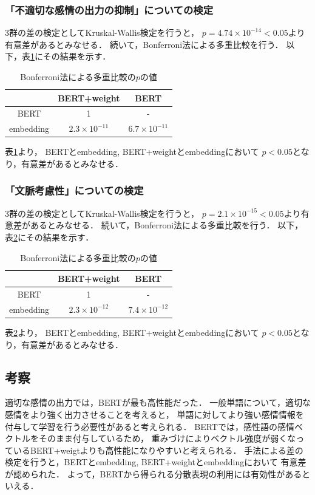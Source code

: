 	\subsubsection{「不適切な感情の出力の抑制」についての検定}
		3群の差の検定としてKruskal-Wallis検定を行うと，
		$p=4.74\times10^{-14}<0.05$より有意差があるとみなせる．
		続いて，Bonferroni法による多重比較を行う．
		以下，表\ref{table:jikken2_bad_Bonferroni}にその結果を示す．
		\begin{table}[H]
			\centering
			\caption{Bonferroni法による多重比較の$p$の値}
			\label{table:jikken2_bad_Bonferroni}
			\begin{tabular}{|c|c|c|}
				\hline
				& BERT+weight & BERT \\
				\hline
				BERT & 1 & - \\
				\hline
				embedding & $2.3\times10^{-11}$ & $6.7\times10^{-11}$ \\
				\hline
			\end{tabular}
		\end{table}
		表\ref{table:jikken2_bad_Bonferroni}より，
		BERTとembedding, BERT+weightとembeddingにおいて
		$p<0.05$となり，有意差があるとみなせる．
	\subsubsection{「文脈考慮性」についての検定}
		3群の差の検定としてKruskal-Wallis検定を行うと，
		$p=2.1\times10^{-15}<0.05$より有意差があるとみなせる．
		続いて，Bonferroni法による多重比較を行う．
		以下，表\ref{table:jikken2_context_Bonferroni}にその結果を示す．
		\begin{table}[H]
			\centering
			\caption{Bonferroni法による多重比較の$p$の値}
			\label{table:jikken2_context_Bonferroni}
			\begin{tabular}{|c|c|c|}
				\hline
				& BERT+weight & BERT \\
				\hline
				BERT & 1 & - \\
				\hline
				embedding & $2.3\times10^{-12}$ & $7.4\times10^{-12}$ \\
				\hline
			\end{tabular}
		\end{table}
		表\ref{table:jikken2_context_Bonferroni}より，
		BERTとembedding, BERT+weightとembeddingにおいて
		$p<0.05$となり，有意差があるとみなせる．

	\subsection{考察}
		適切な感情の出力では，BERTが最も高性能だった．
		一般単語について，適切な感情をより強く出力させることを考えると，
		単語に対してより強い感情情報を付与して学習を行う必要性があると考えられる．
		BERTでは，感性語の感情ベクトルをそのまま付与しているため，
		重みづけによりベクトル強度が弱くなっているBERT+weigtよりも高性能になりやすいと考えられる．
		手法による差の検定を行うと，BERTとembedding, BERT+weightとembeddingにおいて
		有意差が認められた．
		よって，BERTから得られる分散表現の利用には有効性があるといえる．

